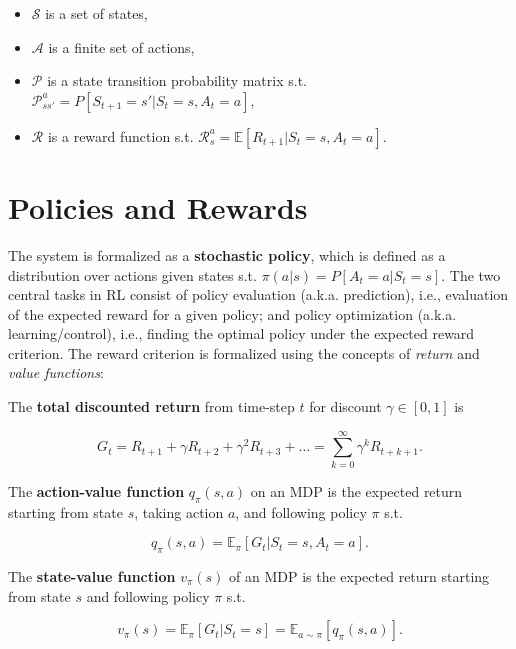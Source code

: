   \begin{itemize}
  \item $\mathcal{S}$ is a set of states,
  \item $\mathcal{A}$ is a finite set of actions,
  \item $\mathcal{P}$ is a state transition probability matrix s.t. $\mathcal{P}_{ss'}^{a} = P[S_{t+1} = s' | S_t = s, A_t = a]$, 
  \item $\mathcal{R}$ is a reward function  s.t. $\mathcal{R}_s^a = \mathbb{E}[R_{t+1}| S_t = s, A_t = a]$. 
  \end{itemize}


\section{Policies and Rewards}

The system is formalized as a \textbf{stochastic policy}, which is defined as a
distribution over actions given states s.t. $\pi(a|s) = P[A_t = a| S_t = s]$.
The two central tasks in RL consist of policy evaluation (a.k.a. prediction),
i.e., evaluation of the expected reward for a given policy; and policy
optimization (a.k.a. learning/control), i.e., finding the optimal policy under
the expected reward criterion. The reward criterion is formalized using the
concepts of \emph{return} and \emph{value functions}: 

\noindent The \textbf{total discounted return} from time-step $t$ for discount $\gamma \in [0,1]$ is

\begin{equation}
    G_t = R_{t+1} + \gamma R_{t+2} + \gamma^2 R_{t+3} + \ldots = \sum_{k=0}^{\infty}\gamma^k R_{t+k+1}.
\end{equation}

The \textbf{action-value function} $q_{\pi}(s,a)$ on an MDP is the expected return starting from state $s$, taking action $a$, and following policy $\pi$ s.t.

\begin{equation}
   q_{\pi}(s,a) = \mathbb{E}_{\pi}[G_t | S_t = s, A_t = a].
\end{equation}

The \textbf{state-value function} $v_{\pi}(s)$ of an MDP is the expected return starting from state $s$ and following policy $\pi$ s.t.

\begin{equation}
    v_{\pi}(s) = \mathbb{E}_{\pi}[G_t | S_t = s] = \mathbb{E}_{a \sim \pi}[q_{\pi}(s,a)] .
\end{equation}

